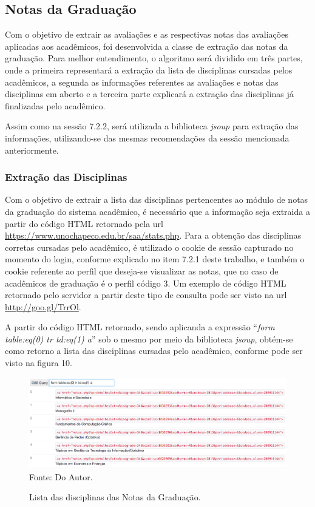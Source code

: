 \subsection{Notas da Graduação}
Com o objetivo de extrair as avaliações e as respectivas notas das avaliações aplicadas aos acadêmicos, foi desenvolvida a classe de extração das notas da graduação. Para melhor entendimento, o algoritmo será dividido em três partes, onde a primeira representará a extração da lista de disciplinas cursadas pelos acadêmicos, a segunda as informações referentes as avaliações e notas das disciplinas em aberto e a terceira parte explicará a extração das disciplinas já finalizadas pelo acadêmico.

Assim como na sessão 7.2.2, será utilizada a biblioteca \emph{jsoup} para extração das informações, utilizando-se das mesmas recomendações da sessão mencionada anteriormente.

\subsubsection{Extração das Disciplinas}
Com o objetivo de extrair a lista das disciplinas pertencentes ao módulo de notas da graduação do sistema acadêmico, é necessário que a informação seja extraida a partir do código HTML retornado pela url \url{https://www.unochapeco.edu.br/saa/stats.php}. Para a obtenção das disciplinas corretas cursadas pelo acadêmico, é utilizado o cookie de sessão capturado no momento do login, conforme explicado no item 7.2.1 deste trabalho, e também o cookie referente ao perfil que deseja-se visualizar as notas, que no caso de acadêmicos de graduação é o perfil código 3. Um exemplo de código HTML retornado pelo servidor a partir deste tipo de consulta pode ser visto na url \url{http://goo.gl/TrrOl}.

A partir do código HTML retornado, sendo aplicanda a expressão ``\emph{form table:eq(0) tr td:eq(1) a}'' sob o mesmo por meio da biblioteca \emph{jsoup}, obtém-se como retorno a lista das disciplinas cursadas pelo acadêmico, conforme pode ser visto na figura 10.

\begin{figure}[!htb]
     \centering
     \caption[Extração de Informações - Lista das disciplinas Notas da Graduação]{Lista das disciplinas das Notas da Graduação.}
     \includegraphics[scale=0.45]{imagens/listadisciplinasnotasgraduacao.png}
     \\  Fonte: Do Autor.
\end{figure}


